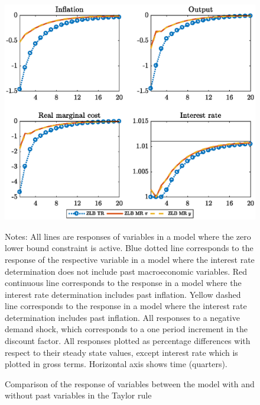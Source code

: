 \documentclass[11pt]{article}
\numberwithin{equation}{section}
\begin{document}
\begin{figure}[H]
	\centering
	\caption{Comparison of the response of variables between the model with and without past variables in the Taylor rule}\label{fig:irfCompLevel_pref}
	\includegraphics[scale=.6]{irfCompLevel_pref}
	\begin{minipage}{\linewidth}
    	\vspace{1mm}
	\footnotesize{{\sc Notes:} All lines are responses of variables in a model where the zero lower bound constraint is active. Blue dotted line corresponds to the response of the respective variable in a model where the interest rate determination does not include past macroeconomic variables. Red continuous line corresponds to the response in a model where the interest rate determination includes past inflation. Yellow dashed line corresponds to the response in a model where the interest rate determination includes past inflation. All responses to a negative demand shock, which corresponds to a one period increment in the discount factor. All responses plotted as percentage differences with respect to their steady state values, except interest rate which is plotted in gross terms. Horizontal axis shows time (quarters).}
	\end{minipage}
\end{figure}
\end{document}

